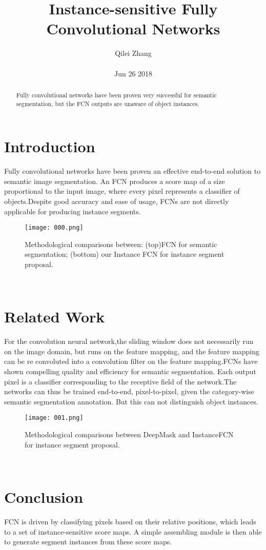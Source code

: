 \documentclass[30pt,twocolumn,letterpaper]{article}
\author{Qilei Zhang\\\\
Jun 26 2018}
\title{Instance-sensitive Fully Convolutional Networks}
\begin{document}
\maketitle
\begin{abstract}
  Fully convolutional networks have been proven very successful for semantic segmentation, but the FCN outputs are unaware of object instances.
\end{abstract}
\section{Introduction}
Fully convolutional networks have been proven an effective end-to-end solution to semantic image segmentation. An FCN produces a score map of a size proportional to the input image, where every pixel represents a classifier of objects.Despite good accuracy and ease of usage, FCNs are not directly applicable for producing instance segments\cite{Carson1981Some}. \\
\begin{figure}[htbp]
\small
\centering
\texttt{[image: 000.png]}
\caption{Methodological comparisons between: (top)FCN for semantic segmentation;
(bottom) our Instance FCN for instance segment proposal.}
\label{fig:lable}
\end{figure}\\
\section{Related Work}
For the convolution neural network,the sliding window does not necessarily run on the image domain, but runs on the feature mapping\cite{Heimer2011Disarticulated}, and the feature mapping can be re convoluted into a convolution filter on the feature mapping\cite{Ljungqvist2000Firm}.FCNs have shown compelling quality and efficiency for semantic segmentation. Each output pixel is a classifier corresponding to the receptive field of the network.The networks can thus be trained end-to-end, pixel-to-pixel, given the category-wise semantic segmentation annotation. But this can not distinguish object instances. \\
\begin{figure}[htbp]
\small
\centering
\texttt{[image: 001.png]}
\caption{Methodological comparisons between DeepMask and InstanceFCN for
instance segment proposal.}
\label{fig:lable}
\end{figure}\\
\section{Conclusion}
FCN is driven by classifying pixels based on their relative positions, which leads to a set of instance-sensitive score maps. A simple assembling module is then able to generate segment instances from these score maps\cite{Pereira2015Empirical}.
{\small


}
\end{document}
